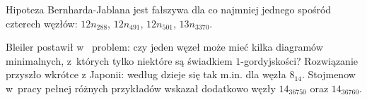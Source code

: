 \begin{example}
%
%
%
%
    Hipoteza Bernharda-Jablana jest fałszywa dla co najmniej jednego spośród czterech węzłów: $12n_{288}$, $12n_{491}$, $12n_{501}$, $13n_{3370}$.
\end{example}

Bleiler postawił w~\cite{bleiler84} problem: czy jeden węzeł może mieć kilka diagramów minimalnych, z~których tylko niektóre są świadkiem $1$-gordyjskości?
Rozwiązanie przyszło wkrótce z Japonii: według \cite{kanenobumurakami86} dzieje się tak m.in. dla węzła $8_{14}$.
%
%
%
Stojmenow w~pracy \cite{stoimenow01} pełnej różnych przykładów wskazał dodatkowo węzły $14_{36750}$ oraz $14_{36760}$.
%
%
%


